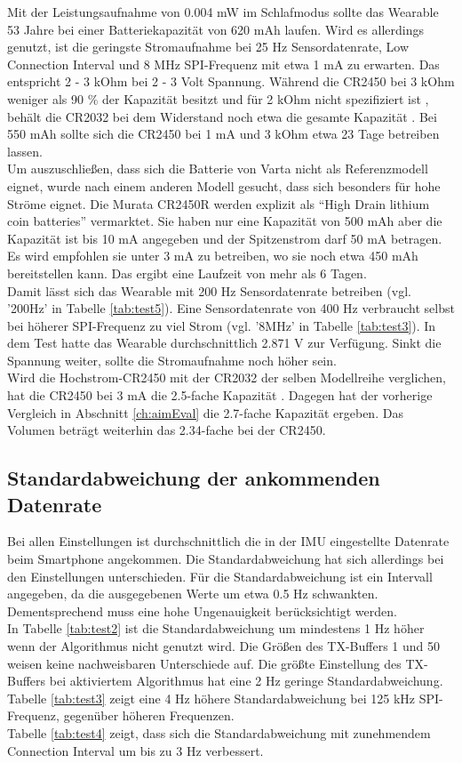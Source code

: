 Mit der Leistungsaufnahme von 0.004 mW im Schlafmodus sollte das Wearable 53 Jahre bei einer Batteriekapazität von 620 mAh laufen.
Wird es allerdings genutzt, ist die geringste Stromaufnahme bei 25 Hz Sensordatenrate, Low Connection Interval und 8 MHz SPI-Frequenz mit etwa 1 mA zu erwarten.
Das entspricht 2 - 3 kOhm bei 2 - 3 Volt Spannung.
Während die CR2450 bei 3 kOhm weniger als 90 \% der Kapazität besitzt und für 2 kOhm nicht spezifiziert ist \cite{datasheet_ds6450}, behält die CR2032 bei dem Widerstand noch etwa die gesamte Kapazität \cite{datasheet_ds6032}.
Bei 550 mAh sollte sich die CR2450 bei 1 mA und 3 kOhm etwa 23 Tage betreiben lassen.\\
Um auszuschließen, dass sich die Batterie von Varta nicht als Referenzmodell eignet, wurde nach einem anderen Modell gesucht, dass sich besonders für hohe Ströme eignet.
Die Murata CR2450R werden explizit als ``High Drain lithium coin batteries'' \cite{site_murataCr2450r} vermarktet.
Sie haben nur eine Kapazität von 500 mAh aber die Kapazität ist bis 10 mA angegeben und der Spitzenstrom darf 50 mA betragen.
Es wird empfohlen sie unter 3 mA zu betreiben, wo sie noch etwa 450 mAh bereitstellen kann.
Das ergibt eine Laufzeit von mehr als 6 Tagen. \cite{site_murataCr2450r}\\
Damit lässt sich das Wearable mit 200 Hz Sensordatenrate betreiben (vgl. '200Hz' in Tabelle \ref{tab:test5}).
Eine Sensordatenrate von 400 Hz verbraucht selbst bei höherer SPI-Frequenz zu viel Strom (vgl. '8MHz' in Tabelle \ref{tab:test3}).
In dem Test hatte das Wearable durchschnittlich 2.871 V zur Verfügung.
Sinkt die Spannung weiter, sollte die Stromaufnahme noch höher sein.\\
Wird die Hochstrom-CR2450 mit der CR2032 der selben Modellreihe verglichen, hat die CR2450 bei 3 mA die 2.5-fache Kapazität \cite{site_murataCr2032r}.
Dagegen hat der vorherige Vergleich in Abschnitt \ref{ch:aimEval} die 2.7-fache Kapazität ergeben.
Das Volumen beträgt weiterhin das 2.34-fache bei der CR2450.

\subsection{Standardabweichung der ankommenden Datenrate}
Bei allen Einstellungen ist durchschnittlich die in der IMU eingestellte Datenrate beim Smartphone angekommen.
Die Standardabweichung hat sich allerdings bei den Einstellungen unterschieden.
Für die Standardabweichung ist ein Intervall angegeben, da die ausgegebenen Werte um etwa 0.5 Hz schwankten.
Dementsprechend muss eine hohe Ungenauigkeit berücksichtigt werden.\\
In Tabelle \ref{tab:test2} ist die Standardabweichung um mindestens 1 Hz höher wenn der Algorithmus nicht genutzt wird.
Die Größen des TX-Buffers 1 und 50 weisen keine nachweisbaren Unterschiede auf.
Die größte Einstellung des TX-Buffers bei aktiviertem Algorithmus hat eine 2 Hz geringe Standardabweichung.\\
Tabelle \ref{tab:test3} zeigt eine 4 Hz höhere Standardabweichung bei 125 kHz SPI-Frequenz, gegenüber höheren Frequenzen.\\
Tabelle \ref{tab:test4} zeigt, dass sich die Standardabweichung mit zunehmendem Connection Interval um bis zu 3 Hz verbessert.

